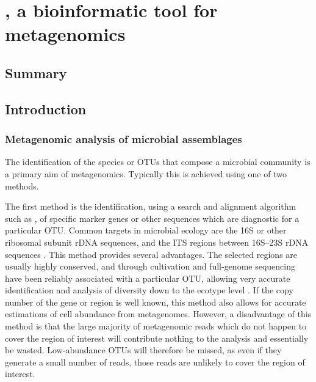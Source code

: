 \chapter{, a bioinformatic tool for metagenomics}
\label{ch:minspec}


\section{Summary}

\section{Introduction}

\subsection{Metagenomic analysis of microbial assemblages}

The identification of the species or \acp{OTU} that compose a microbial community is a primary aim of metagenomics.
Typically this is achieved using one of two methods.

The first method is the identification, using a search and alignment algorithm such as , of specific marker genes or other sequences which are diagnostic for a particular \ac{OTU}.
Common targets in microbial ecology are the 16S or other ribosomal subunit rDNA sequences, and the \ac{ITS} regions between 16S--23S rDNA sequences \citep[e.g.][]{Brown:2012gna}.
This method provides several advantages.
The selected regions are usually highly conserved, and through cultivation and full-genome sequencing have been reliably associated with a particular \ac{OTU}, allowing very accurate identification and analysis of diversity down to the ecotype level \citep[e.g.][]{Brown:2012gna}.
If the copy number of the gene or region is well known, this method also allows for accurate estimations of cell abundance from metagenomes.
However, a disadvantage of this method is that the large majority of metagenomic reads which do not happen to cover the region of interest will contribute nothing to the analysis and essentially be wasted.
Low-abundance \acp{OTU} will therefore be missed, as even if they generate a small number of reads, those reads are unlikely to cover the region of interest.

